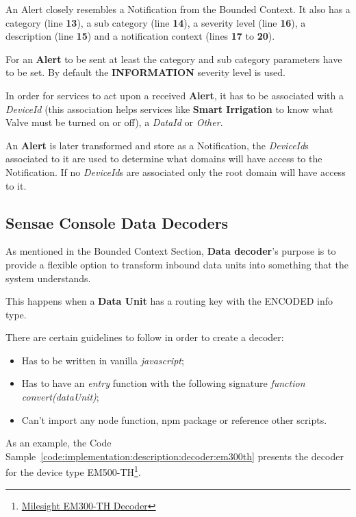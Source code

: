 An Alert closely resembles a Notification from the  Bounded Context. It also has a category (line \textbf{13}), a sub category (line \textbf{14}), a severity level (line \textbf{16}), a description (line \textbf{15}) and a notification context (lines \textbf{17} to \textbf{20}).

For an \textbf{Alert} to be sent at least the category and sub category parameters have to be set. By default the \textbf{INFORMATION} severity level is used.

In order for services to act upon a received \textbf{Alert}, it has to be associated with a \textit{DeviceId} (this association helps services like \textbf{Smart Irrigation} to know what Valve must be turned on or off), a \textit{DataId} or \textit{Other}.

An \textbf{Alert} is later transformed and store as a Notification, the \textit{DeviceId}s associated to it are used to determine what domains will have access to the Notification. If no \textit{DeviceId}s are associated only the root domain will have access to it.

\subsection{Sensae Console Data Decoders}
\label{subsec:implementation:description:decoder}

As mentioned in the  Bounded Context Section, \textbf{Data decoder}'s purpose is to provide a flexible option to transform inbound data units into something that the system understands.

This happens when a \textbf{Data Unit} has a routing key with the ENCODED info type.

There are certain guidelines to follow in order to create a decoder:

\begin{itemize}
    \item Has to be written in vanilla \textit{javascript};
    \item Has to have an \textit{entry} function with the following signature \textit{function convert(dataUnit)};
    \item Can't import any node function, npm package or reference other scripts.
\end{itemize}

As an example, the Code Sample~\ref{code:implementation:description:decoder:em300th} presents the decoder for the device type EM500-TH\footnote{\href {https://www.milesight-iot.com/lorawan/sensor/em300-th}{Milesight EM300-TH Decoder}}.


